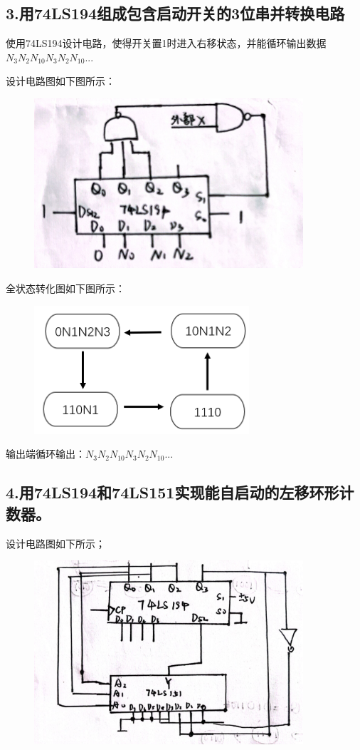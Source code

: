 \documentclass{ctexart}
\begin{document}
    \newpage
    \subsection*{3.用74LS194组成包含启动开关的3位串并转换电路}
    使用74LS194设计电路，使得开关置1时进入右移状态，并能循环输出数据$N_3N_2N_10N_3N_2N_10...$
    
    设计电路图如下图所示：
    
    \begin{figure}[htbp]
        \centering
        \includegraphics[width=10cm]{3.3.1.jpg}
    \end{figure}

    全状态转化图如下图所示：
     \begin{figure}[htbp]
        \centering
        \includegraphics[width=8cm]{3.3.2.png}
    \end{figure}

    输出端循环输出：$N_3N_2N_10N_3N_2N_10...$

    \subsection*{4.用74LS194和74LS151实现能自启动的左移环形计数器。}
    \newpage
    设计电路图如下所示；
    
    \begin{figure}[htbp]
        \centering
        \includegraphics[width=10cm]{3.4.1.jpg}
    \end{figure}
\end{document}
